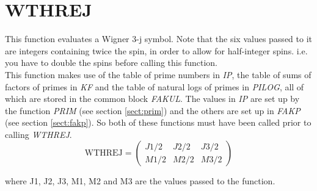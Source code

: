 \section{WTHREJ}
\label{sect:wthrej}

\noindent This function evaluates a Wigner 3-j symbol. Note that the six
values passed to it are integers containing twice the spin, in order to
allow for half-integer spins. i.e. you have to double the spins before
calling this function.\\

\noindent This function makes use of the table of prime numbers in {\em IP},
the table of sums of factors of primes in {\em KF} and the table of natural
logs of primes in {\em PILOG}, all of which are stored in the common block
{\em FAKUL}. The values in {\em IP} are set up by the function {\em PRIM}
(see section \ref{sect:prim}) and the others are set up in {\em FAKP} (see
section \ref{sect:fakp}). So both of these functions must have been called
prior to calling {\em WTHREJ}.\\

\begin{equation}
\mathrm{WTHREJ} =
\begin{pmatrix}
J1 / 2 & J2 / 2 & J3 / 2\\
M1 / 2 & M2 / 2 & M3 / 2
\end{pmatrix}
\end{equation}

\noindent where J1, J2, J3, M1, M2 and M3 are the values passed to the
function.\\
